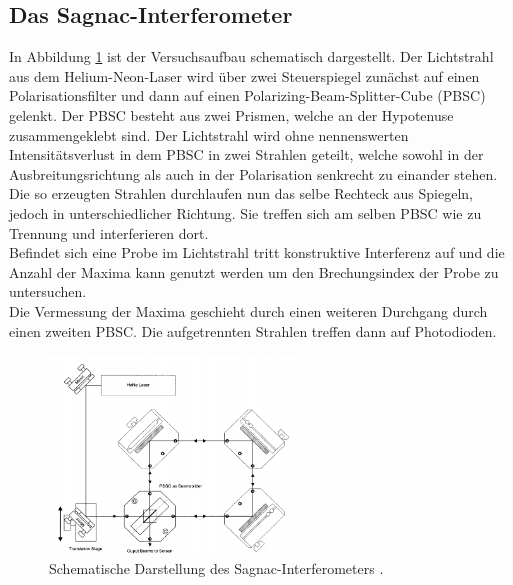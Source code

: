 \subsection{Das Sagnac-Interferometer}
In Abbildung \ref{fig:Aufbau} ist der Versuchsaufbau schematisch dargestellt. Der
Lichtstrahl aus dem Helium-Neon-Laser wird über zwei Steuerspiegel zunächst auf einen Polarisationsfilter
und dann auf einen Polarizing-Beam-Splitter-Cube (PBSC) gelenkt. Der PBSC besteht aus zwei Prismen, welche
an der Hypotenuse zusammengeklebt sind. Der Lichtstrahl wird ohne nennenswerten Intensitätsverlust
in dem PBSC in zwei Strahlen geteilt,
welche sowohl in der Ausbreitungsrichtung als auch in der Polarisation senkrecht zu einander stehen. Die
so erzeugten Strahlen durchlaufen nun das selbe Rechteck aus Spiegeln, jedoch in unterschiedlicher Richtung.
Sie treffen sich am selben PBSC wie zu Trennung und interferieren dort.\\
Befindet sich eine Probe im Lichtstrahl tritt konstruktive Interferenz auf und die Anzahl der Maxima
kann genutzt werden um den Brechungsindex der Probe zu untersuchen.\\
Die Vermessung der Maxima geschieht durch einen weiteren Durchgang durch einen zweiten PBSC.
Die aufgetrennten Strahlen treffen dann auf Photodioden.
\begin{figure}[H]
  \centering
  \includegraphics[width=0.6\textwidth]{pics/Aufbau.png}
  \caption{Schematische Darstellung des Sagnac-Interferometers \cite{Anleitung}.}
  \label{fig:Aufbau}
\end{figure}
